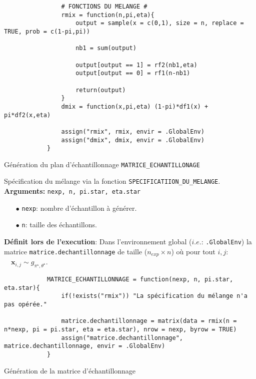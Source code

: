 \documentclass{article}
\newenvironment{fonction}[1][htb]
  {\renewcommand{\algorithmcfname}{Fonction}%
   \begin{algorithm}[#1]%
  }{\end{algorithm}}
\begin{document}
\begin{script}[h!]
\begin{verbatim}
                # FONCTIONS DU MELANGE #
                rmix = function(n,pi,eta){
                    output = sample(x = c(0,1), size = n, replace = TRUE, prob = c(1-pi,pi))
                    
                    nb1 = sum(output)
                    
                    output[output == 1] = rf2(nb1,eta)
                    output[output == 0] = rf1(n-nb1)
                    
                    return(output)
                }
                dmix = function(x,pi,eta) (1-pi)*df1(x) + pi*df2(x,eta)

                assign("rmix", rmix, envir = .GlobalEnv)
                assign("dmix", dmix, envir = .GlobalEnv)
            }
        \end{verbatim}
    \end{script}

\clearpage
\pagebreak
    
    \begin{fonction}
        \caption{Génération du plan d'échantillonnage \texttt{MATRICE\_ECHANTILLONAGE}}
        \Apriori Spécification du mélange via la fonction \texttt{SPECIFICATIION\_DU\_MELANGE}. \\
        \vspace*{0.2cm}
        \textbf{Arguments:} \texttt{nexp, n, pi.star, eta.star}
        \begin{itemize}
            \item[$\bullet$] \texttt{nexp}: nombre d'échantillon à générer.
            \item[$\bullet$] \texttt{n}: taille des échantillons.
        \end{itemize}
        \vspace*{0.2cm}
        \textbf{Définit lors de l'execution}: Dans l'environnement global ($i.e.$: \texttt{.GlobalEnv}) la matrice \texttt{matrice.dechantillonnage} de taille ($n_{exp}\times{}n$) où pour tout $i,j$: $\quad\mathbf{x}_{i,j}\sim{}g_{\pi^\star,\theta^\star}$.
    \end{fonction}
    \begin{script}[h]
        \begin{verbatim}
            MATRICE_ECHANTILLONNAGE = function(nexp, n, pi.star, eta.star){
                if(!exists("rmix")) "La spécification du mélange n'a pas opérée."
  
                matrice.dechantillonnage = matrix(data = rmix(n = n*nexp, pi = pi.star, eta = eta.star), nrow = nexp, byrow = TRUE)
                assign("matrice.dechantillonnage", matrice.dechantillonnage, envir = .GlobalEnv)
            }
        \end{verbatim}
    \caption{Génération de la matrice d'échantillonnage}
    \end{script}
\end{document}
